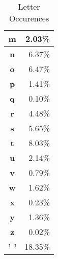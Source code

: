 \documentclass{article}
\begin{document}
\begin{table}[h]
\begin{tabular}{|c|r|}
            \textbf{m}                              & 2.03\%                                   \\ \hline
            \textbf{n}                              & 6.37\%                                     \\ \hline
            \textbf{o}                              & 6.47\%                                     \\ \hline
            \textbf{p}                              & 1.41\%                                   \\ \hline
            \textbf{q}                              & 0.10\%                               \\ \hline
            \textbf{r}                              & 4.48\%                                     \\ \hline
            \textbf{s}                              & 5.65\%                                     \\ \hline
            \textbf{t}                              & 8.03\%                                     \\ \hline
            \textbf{u}                              & 2.14\%                                    \\ \hline
            \textbf{v}                              & 0.79\%                                  \\ \hline
            \textbf{w}                              & 1.62\%                                   \\ \hline
            \textbf{x}                              & 0.23\%                                \\ \hline
            \textbf{y}                              & 1.36\%                                   \\ \hline
            \textbf{z}                              & 0.02\%                              \\ \hline
            \textbf{' '}                            & 18.35\%                                      \\ \hline
        \end{tabular}
        \caption{Letter Occurences}\label{occur}
    \end{table}
\end{document}
